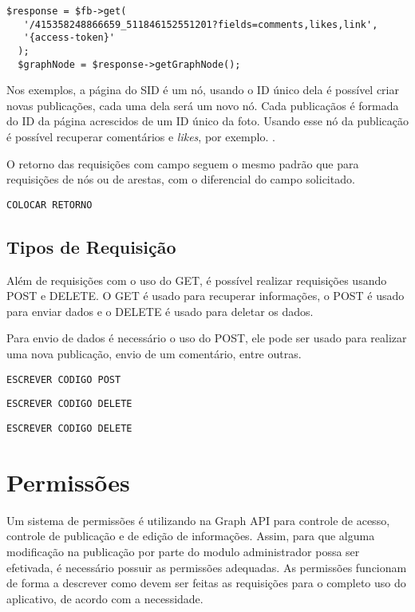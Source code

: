 \begin{lstlisting}[caption={Requsição de diversos atributos},label={lst:requisicao8}]
  $response = $fb->get(
   '/415358248866659_511846152551201?fields=comments,likes,link', 
   '{access-token}'
  );
  $graphNode = $response->getGraphNode();
\end{lstlisting}

Nos exemplos, a página do SID é um nó, usando o ID único dela é possível criar novas publicações, cada uma dela será um novo nó. Cada publicaçãos é formada do ID da página acrescidos de um ID único da foto. Usando esse nó da publicação é possível recuperar comentários e \textit{likes}, por exemplo. \cite{facebook2018b}.

O retorno das requisições com campo seguem o mesmo padrão que para requisições de nós ou de arestas, com o diferencial do campo solicitado.

\begin{lstlisting}[caption={Retorno das requisições \ref{lst:requisicao7} e \ref{lst:requisicao8} (Campos)}, label={lst:retornoRequisicao8}]
COLOCAR RETORNO
\end{lstlisting}

\subsection{Tipos de Requisição}
Além de requisições com o uso do GET, é possível realizar requisições usando POST e DELETE. O GET é usado para recuperar informações, o POST é usado para enviar dados e o DELETE é usado para deletar os dados.

Para envio de dados é necessário o uso do POST, ele pode ser usado para realizar uma nova publicação, envio de um comentário, entre outras.
\begin{lstlisting}[caption={Requsição POST},label={lst:requisicao9}]
ESCREVER CODIGO POST
\end{lstlisting}

\begin{lstlisting}[caption={Requsição DELETE},label={lst:requisicao10}]
ESCREVER CODIGO DELETE
\end{lstlisting}

\begin{lstlisting}[caption={Retorno das requisições \ref{lst:requisicao9} e \ref{lst:requisicao10}},label={lst:requisicao11}]
ESCREVER CODIGO DELETE
\end{lstlisting}

\section{Permissões}
\label{sec:permissoes}
Um sistema de permissões é utilizando na Graph API para controle de acesso, controle de publicação e de edição de informações. Assim, para que alguma modificação na publicação por parte do modulo administrador possa ser efetivada, é necessário possuir as permissões adequadas. As permissões funcionam de forma a descrever como devem ser feitas as requisições para o completo uso do aplicativo, de acordo com a necessidade.

